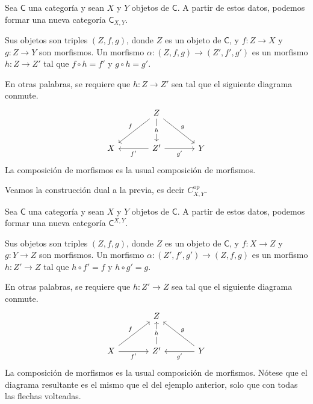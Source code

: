 \documentclass[../main.tex]{subfiles}
\begin{document}
\begin{exampleap}\label{prodcat}
    Sea $\mathsf{C}$ una categor\'ia y sean $X$ y $Y$ objetos de $\mathsf{C}$.
    A partir de estos datos, podemos formar una nueva categor\'ia $\mathsf{C}_{X,Y}$.

    Sus objetos son triples $(Z,f,g)$, donde $Z$ es un objeto de $\mathsf{C}$, y $f:Z \to X$ y $g:Z \to Y$ son morfismos.
    Un morfismo $\alpha: (Z, f , g) \to (Z', f',g')$ es un morfismo $h: Z \to Z'$ tal que $f \circ h = f'$ y $g \circ h = g'$.

    En otras palabras, se requiere que $h:Z \to Z'$ sea tal que el siguiente diagrama conmute.
    \[\begin{tikzcd}[row sep=large,column sep=large]
            & Z \\
            X & {Z'} & Y
            \arrow["f"', from=1-2, to=2-1]
            \arrow["{f'}", from=2-2, to=2-1]
            \arrow["g", from=1-2, to=2-3]
            \arrow["{g'}"', from=2-2, to=2-3]
            \arrow["h"{description}, from=1-2, to=2-2]
        \end{tikzcd}\]
    La composici\'on de morfismos es la usual composici\'on de morfismos.
\end{exampleap}

\begin{exampleap}\label{coprodcat}
    Veamos la construcci\'on dual a la previa, es decir $C^{\text{op}}_{X,Y}$.

    Sea $\mathsf{C}$ una categor\'ia y sean $X$ y $Y$ objetos de $\mathsf{C}$.
    A partir de estos datos, podemos formar una nueva categor\'ia $\mathsf{C}^{X,Y}$.

    Sus objetos son triples $(Z,f,g)$, donde $Z$ es un objeto de $\mathsf{C}$, y $f:X \to Z$ y $g:Y \to Z$ son morfismos.
    Un morfismo $\alpha: (Z', f' , g') \to (Z, f,g)$ es un morfismo $h: Z' \to Z$ tal que $h \circ f' = f$ y $h \circ g' = g$.

    En otras palabras, se requiere que $h:Z' \to Z$ sea tal que el siguiente diagrama conmute.
    \[\begin{tikzcd}[row sep=large,column sep=large]
            & Z \\
            X & {Z'} & Y
            \arrow["f", from=2-1, to=1-2]
            \arrow["{f'}"', from=2-1, to=2-2]
            \arrow["g"', from=2-3, to=1-2]
            \arrow["{g'}", from=2-3, to=2-2]
            \arrow["h"{description}, from=2-2, to=1-2]
        \end{tikzcd}\]
    La composici\'on de morfismos es la usual composici\'on de morfismos. N\'otese que el diagrama resultante es el mismo que el del ejemplo anterior, solo que con todas las flechas volteadas.
\end{exampleap}
\end{document}
